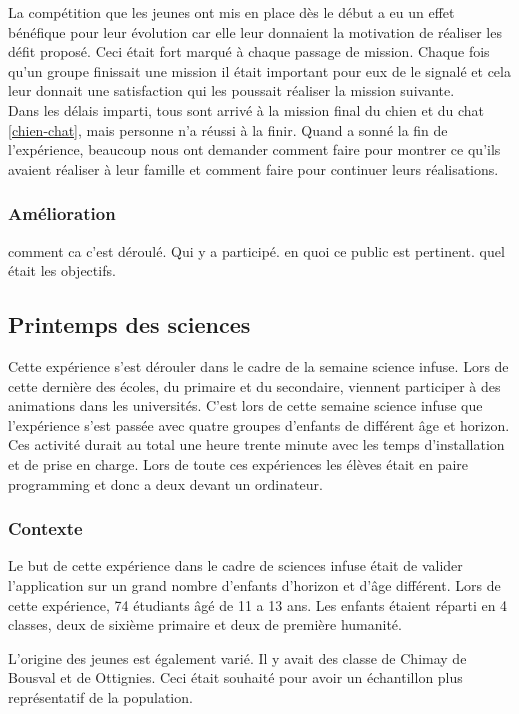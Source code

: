 La compétition que les jeunes ont mis en place dès le début a eu un effet bénéfique pour leur évolution car elle leur donnaient la motivation de réaliser les défit proposé. Ceci était fort marqué à chaque passage de mission. Chaque fois qu'un groupe finissait une mission il était important pour eux de le signalé et cela leur donnait une satisfaction qui les poussait réaliser la mission suivante.\\ %

Dans les délais imparti, tous sont arrivé à la mission final du chien et du chat \ref{chien-chat}, mais personne n'a réussi à la finir. Quand a sonné la fin de l'expérience, beaucoup nous ont demander comment faire pour montrer ce qu'ils avaient réaliser à leur famille et comment faire pour continuer leurs réalisations.

\subsubsection{Amélioration}

comment ca c'est déroulé. Qui y a participé. en quoi ce public est pertinent. quel était les objectifs.

\subsection{Printemps des sciences}
Cette expérience s'est dérouler dans le cadre de la semaine science infuse. Lors de cette dernière des écoles, du primaire et du secondaire, viennent participer à des animations dans les universités. C'est lors de cette semaine science infuse que l'expérience s'est passée avec quatre groupes d'enfants de différent âge et horizon. Ces activité durait au total une heure trente minute avec les temps d'installation et de prise en charge. Lors de toute ces expériences les élèves était en paire programming et donc a deux devant un ordinateur.

\subsubsection{Contexte}
Le but de cette expérience dans le cadre de sciences infuse était de valider l'application sur un grand nombre d'enfants d'horizon et d'âge différent. Lors de cette expérience, 74 étudiants âgé de 11 a 13 ans. Les enfants étaient réparti en 4 classes, deux de sixième primaire et deux de première humanité.

L'origine des jeunes est également varié. Il y avait des classe de Chimay de Bousval et de Ottignies. Ceci était souhaité pour avoir un échantillon plus représentatif de la population.

